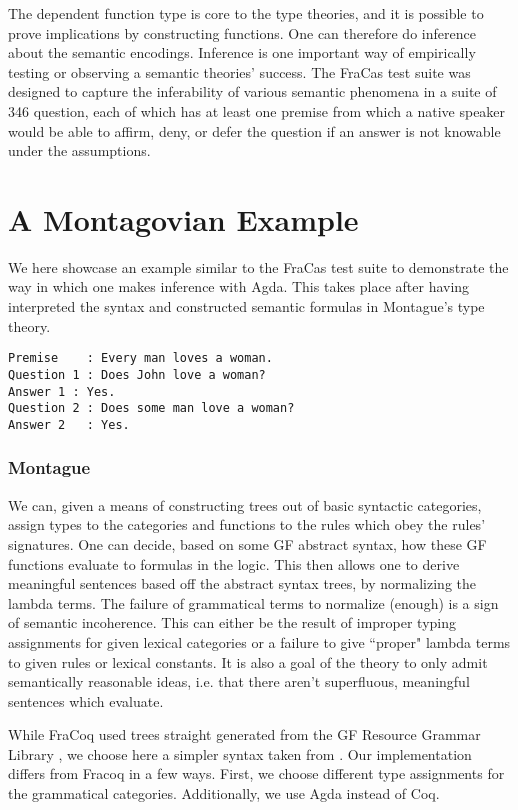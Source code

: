 \documentclass[a4paper, 11pt]{article}
\begin{document}
The dependent function type is core to the type theories, and it is possible to
prove implications by constructing functions. One can therefore do inference
about the semantic encodings. Inference is one important way of empirically
testing or observing a semantic theories' success. The FraCas test suite
\cite{cooper1996using} was designed to capture the inferability of various
semantic phenomena in a suite of 346 question, each of which has at least one
premise from which a native speaker would be able to affirm, deny, or defer the
question if an answer is not knowable under the assumptions.

\section{A Montagovian Example}

We here showcase an example similar to the FraCas test suite to demonstrate the
way in which one makes inference with Agda. This takes place after having
interpreted the syntax and constructed semantic formulas in
Montague's type theory.

\begin{verbatim}
Premise    : Every man loves a woman.
Question 1 : Does John love a woman?
Answer 1 : Yes.
Question 2 : Does some man love a woman?
Answer 2   : Yes.
\end{verbatim}

\subsubsection{Montague}

We can, given a means of constructing trees out of basic syntactic categories,
assign types to the categories and functions to the rules which obey the rules'
signatures. One can decide, based on some GF abstract syntax, how these GF
functions evaluate to formulas in the logic. This then allows one to derive
meaningful sentences based off the abstract syntax trees, by normalizing the
lambda terms. The failure of grammatical terms to normalize (enough) is a sign
of semantic incoherence. This can either be the result of improper typing
assignments for given lexical categories or a failure to give ``proper" lambda
terms to given rules or lexical constants. It is also a goal of the theory to
only admit semantically reasonable ideas, i.e. that there aren't superfluous,
meaningful sentences which evaluate.

While FraCoq used trees straight generated from the GF Resource Grammar Library
\cite{ljunglof2012bilingual}, we choose here a simpler syntax taken from
\cite{nassli}. Our implementation differs from Fracoq in a few ways. First, we
choose different type assignments for the grammatical categories. Additionally,
we use Agda instead of Coq.
\end{document}
